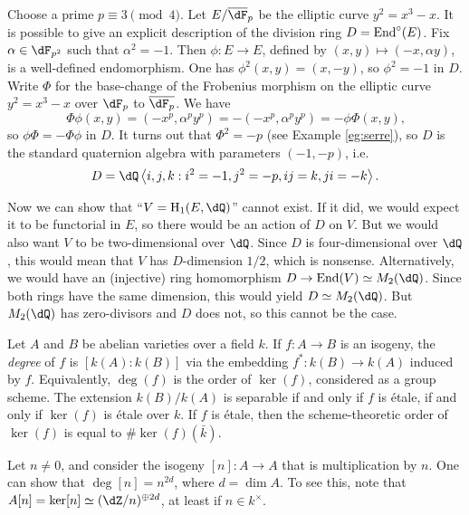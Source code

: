 \begin{example}[Serre]
Choose a prime $p\equiv 3\pmod 4$. Let $E/\overline\dF_p$ be the elliptic 
curve $y^2=x^3-x$. It is possible to give an explicit description of the 
division ring $D=\operatorname{End}^\circ(E)$. Fix $\alpha\in \dF_{p^2}$ such that 
$\alpha^2=-1$. Then $\phi:E\to E$, defined by $(x,y)\mapsto (-x,\alpha y)$, is 
a well-defined endomorphism. One has $\phi^2(x,y)=(x,-y)$, so $\phi^2=-1$ in 
$D$. Write $\Phi$ for the base-change of the Frobenius morphism on the elliptic 
curve $y^2=x^3-x$ over $\dF_p$ to $\overline{\dF_p}$. We have  
\[
  \Phi \phi(x,y) = (-x^p, \alpha^p y^p) = -(-x^p, \alpha^p y^p) = -\phi \Phi(x,y) \text{,}
\]
so $\phi \Phi=-\Phi \phi$ in $D$. It turns out that $\Phi^2=-p$ (see Example 
\ref{eg:serre}), so $D$ is the standard quaternion algebra with parameters 
$(-1,-p)$, i.e.  
\[
  D = \dQ\left\langle i,j,k : i^2=-1,j^2=-p,i j=k, j i=-k\right\rangle \text{.}
\]
\end{example}

Now we can show that ``$V=\h_1(E,\dQ)$'' cannot exist. If it did, we would expect 
it to be functorial in $E$, so there would be an action of $D$ on $V$. But we 
would also want $V$ to be two-dimensional over $\dQ$. Since $D$ is 
four-dimensional over $\dQ$, this would mean that $V$ has $D$-dimension $1/2$, 
which is nonsense. Alternatively, we would have an (injective) ring 
homomorphism $D\to \End(V)\simeq M_2(\dQ)$. Since both rings have the same 
dimension, this would yield $D\simeq M_2(\dQ)$. But $M_2(\dQ)$ has 
zero-divisors and $D$ does not, so this cannot be the case. 






Let $A$ and $B$ be abelian varieties over a field $k$. If $f:A\to B$ is an 
isogeny, the \emph{degree} of $f$ is $[k(A):k(B)]$ via the embedding 
$f^\ast:k(B) \to k(A)$ induced by $f$. Equivalently, $\deg(f)$ is the order 
of $\ker(f)$, considered as a group scheme. The extension $k(B)/k(A)$ is 
separable if and only if $f$ is \'etale, if and only if $\ker(f)$ is \'etale 
over $k$. If $f$ is \'etale, then the scheme-theoretic order of $\ker(f)$ is 
equal to $\# \ker (f)(\bar k)$. 

\begin{example}
Let $n\ne 0$, and consider the isogeny $[n]:A\to A$ that is multiplication by 
$n$. One can show that $\deg[n]=n^{2 d}$, where $d=\dim A$. To see this,  note 
that $A[n]=\ker[n]\simeq (\dZ/n)^{\oplus 2 d}$, at least if $n\in k^\times$. 
\end{example}


